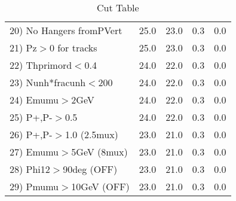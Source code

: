\begin{table}[h!]
\begin{tabular}{||l||r|r|r|r||}
 20) No Hangers fromPVert &        25.0 &        23.0 &         0.3 &         0.0 \\
 21) Pz$>$0 for tracks    &        25.0 &        23.0 &         0.3 &         0.0 \\
 22) Thprimord$<$0.4      &        24.0 &        22.0 &         0.3 &         0.0 \\
 23) Nunh*fracunh$<$200   &        24.0 &        22.0 &         0.3 &         0.0 \\
 24) Emumu$>$2GeV         &        24.0 &        22.0 &         0.3 &         0.0 \\
 25) P+,P-$>$0.5          &        24.0 &        22.0 &         0.3 &         0.0 \\
 26) P+,P-$>$1.0 (2.5mux) &        23.0 &        21.0 &         0.3 &         0.0 \\
 27) Emumu$>$5GeV  (8mux) &        23.0 &        21.0 &         0.3 &         0.0 \\
 28) Phi12$>$90deg  (OFF) &        23.0 &        21.0 &         0.3 &         0.0 \\
 29) Pmumu$>$10GeV  (OFF) &        23.0 &        21.0 &         0.3 &         0.0 \\
 \hline
 \hline
 \end{tabular}
 \caption{Cut Table \cohpip }
 \label{tab-cut_copip}
 \end{table}
